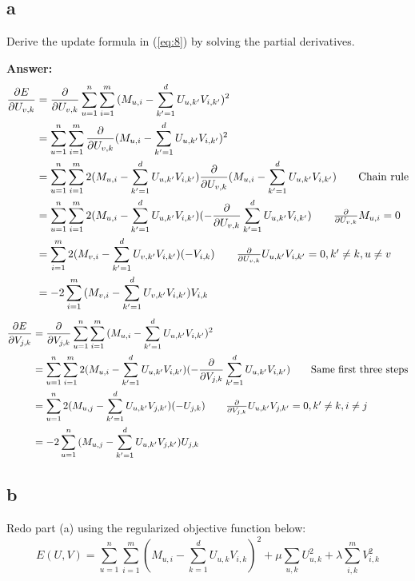 \documentclass{article}
\begin{document}
\subsection{a}
Derive the update formula in (\ref{eq:8}) by solving the partial derivatives.

\textbf{Answer:}
\begin{align*}
    \frac{\partial E}{\partial U_{v,k}} &= \frac{\partial}{\partial U_{v,k}}\sum_{u=1}^n\sum_{i=1}^m{(M_{u,i} - \sum_{k'=1}^d{U_{u,k'}V_{i,k'}})^2}\\
    &= \sum_{u=1}^n\sum_{i=1}^m{\frac{\partial}{\partial U_{v,k}}(M_{u,i} - \sum_{k'=1}^d{U_{u,k'}V_{i,k'}})^2}\\
    &= \sum_{u=1}^n\sum_{i=1}^m{2(M_{u,i} - \sum_{k'=1}^d{U_{u,k'}V_{i,k'}})\frac{\partial}{\partial U_{v,k}}(M_{u,i} - \sum_{k'=1}^d{U_{u,k'}V_{i,k'}})}\tag*{\text{Chain rule}}\\
    &= \sum_{u=1}^n\sum_{i=1}^m{2(M_{u,i} - \sum_{k'=1}^d{U_{u,k'}V_{i,k'}})(-\frac{\partial}{\partial U_{v,k}}\sum_{k'=1}^d{U_{u,k'}V_{i,k'}})}\tag*{$\frac{\partial}{\partial U_{v,k}}M_{u,i} = 0$}\\
    &= \sum_{i=1}^m{2(M_{v,i} - \sum_{k'=1}^d{U_{v,k'}V_{i,k'}})(-V_{i,k})}\tag*{$\frac{\partial}{\partial U_{v,k}}U_{u,k'}V_{i,k'} = 0, k' \neq k, u \neq v$}\\
    &= -2\sum_{i=1}^m{(M_{v,i} - \sum_{k'=1}^d{U_{v,k'}V_{i,k'}})V_{i,k}}
\end{align*}
\begin{align*}
    \frac{\partial E}{\partial V_{j,k}} &= \frac{\partial}{\partial V_{j,k}}\sum_{u=1}^n\sum_{i=1}^m{(M_{u,i} - \sum_{k'=1}^d{U_{u,k'}V_{i,k'}})^2}\\
    &= \sum_{u=1}^n\sum_{i=1}^m{2(M_{u,i} - \sum_{k'=1}^d{U_{u,k'}V_{i,k'}})(-\frac{\partial}{\partial V_{j,k}}\sum_{k'=1}^d{U_{u,k'}V_{i,k'}})}\tag*{\text{Same first three steps}}\\
    &= \sum_{u=1}^n{2(M_{u,j} - \sum_{k'=1}^d{U_{u,k'}V_{j,k'}})(-U_{j,k})}\tag*{\text{$\frac{\partial}{\partial V_{j,k}}U_{u,k'}V_{j,k'} = 0, k' \neq k, i \neq j$}}\\
    &= -2\sum_{u=1}^n{(M_{u,j} - \sum_{k'=1}^d{U_{u,k'}V_{j,k'}})U_{j,k}}
\end{align*}

\subsection{b}
Redo part (a) using the regularized objective function below:
$$E(U,V) = \sum_{u=1}^n\sum_{i=1}^m{(M_{u,i} - \sum_{k=1}^d{U_{u,k}V_{i,k}})^2} + \mu\sum_{u, k}{U_{u,k}^2} + \lambda\sum_{i,k}^m{V_{i,k}^2}$$
\end{document}
